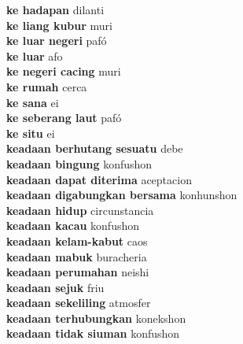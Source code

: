 \textbf{ ke hadapan  } dilanti \\
\textbf{ ke liang kubur  } muri \\
\textbf{ ke luar negeri  } pafó \\
\textbf{ ke luar  } afo \\
\textbf{ ke negeri cacing  } muri \\
\textbf{ ke rumah  } cerca \\
\textbf{ ke sana  } ei \\
\textbf{ ke seberang laut  } pafó \\
\textbf{ ke situ  } ei \\
\textbf{ keadaan berhutang sesuatu  } debe \\
\textbf{ keadaan bingung  } konfushon \\
\textbf{ keadaan dapat diterima  } aceptacion \\
\textbf{ keadaan digabungkan bersama  } konhunshon \\
\textbf{ keadaan hidup  } circunstancia \\
\textbf{ keadaan kacau  } konfushon \\
\textbf{ keadaan kelam-kabut  } caos \\
\textbf{ keadaan mabuk  } buracheria \\
\textbf{ keadaan perumahan  } neishi \\
\textbf{ keadaan sejuk  } friu \\
\textbf{ keadaan sekeliling  } atmosfer \\
\textbf{ keadaan terhubungkan  } konekshon \\
\textbf{ keadaan tidak siuman  } konfushon \\
